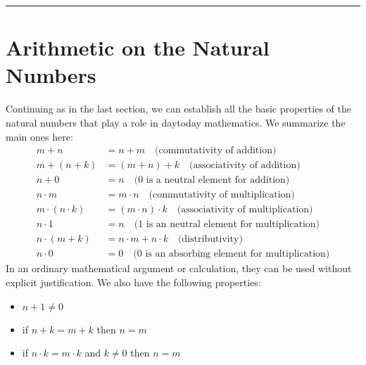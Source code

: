 \documentclass[letterpaper,10pt,english]{sphinxmanual}
\begin{document}
\bigskip\hrule\bigskip



\section{Arithmetic on the Natural Numbers}
\label{\detokenize{the_natural_numbers_and_induction:arithmetic-on-the-natural-numbers}}\label{\detokenize{the_natural_numbers_and_induction:id4}}
\sphinxAtStartPar
Continuing as in the last section, we can establish all the basic properties of the natural numbers that play a role in day\sphinxhyphen{}to\sphinxhyphen{}day mathematics. We summarize the main ones here:
\begin{equation*}
\begin{split}m + n &= n + m \quad \text{(commutativity of addition)}\\
m + (n + k) &= (m + n) + k \quad \text{(associativity of addition)}\\
n + 0 &= n \quad \text{($0$ is a neutral element for addition)}\\
n \cdot m &= m \cdot n \quad \text{(commutativity of multiplication)}\\
m \cdot (n \cdot k) &= (m \cdot n) \cdot k \quad \text{(associativity of multiplication)}\\
n \cdot 1 &= n \quad \text{($1$ is an neutral element for multiplication)}\\
n \cdot (m + k) &= n \cdot m + n \cdot k \quad \text{(distributivity)}\\
n \cdot 0 &= 0 \quad \text{($0$ is an absorbing element for multiplication)}\end{split}
\end{equation*}
\sphinxAtStartPar
In an ordinary mathematical argument or calculation, they can be used without explicit justification. We also have the following properties:
\begin{itemize}
\item {} 
\sphinxAtStartPar
\(n + 1 \neq 0\)

\item {} 
\sphinxAtStartPar
if \(n + k = m + k\) then \(n = m\)

\item {} 
\sphinxAtStartPar
if \(n \cdot k = m \cdot k\) and \(k \neq 0\) then \(n = m\)

\end{itemize}
\end{document}
